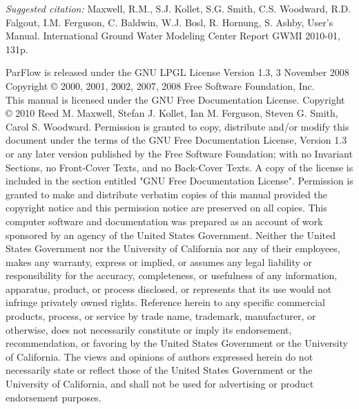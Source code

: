 
\begin{CopyrightPage}
{\em Suggested citation: }Maxwell, R.M., S.J. Kollet, S.G. Smith, C.S. Woodward, R.D. Falgout, I.M. Ferguson, C. Baldwin, W.J. Bosl, R. Hornung, S. Ashby, \parflow{} User's Manual. International Ground Water Modeling Center Report GWMI 2010-01, 131p.\newline

{ \scriptsize
\noindent ParFlow is released under the GNU LPGL License \newline
\noindent Version 1.3, 3 November 2008 \newline
\noindent Copyright \copyright{} 2000, 2001, 2002, 2007, 2008  Free Software Foundation, Inc.\newline
{}\\
This manual is licensed under the GNU Free Documentation License.\newline\vspace{1em}
Copyright \copyright{} 2010  Reed M. Maxwell, Stefan J. Kollet, Ian M. Ferguson, Steven G. Smith, Carol S. Woodward. 
Permission is granted to copy, distribute and/or modify this document
under the terms of the GNU Free Documentation License, Version 1.3
or any later version published by the Free Software Foundation; with no Invariant Sections, no Front-Cover Texts, and no Back-Cover Texts. A copy of the license is included in the section entitled "GNU Free Documentation License".
Permission is granted to make and distribute verbatim copies of this
manual provided the copyright notice and this permission notice are
preserved on all copies.\newline\vspace{0.1em}
This computer software and documentation was prepared as an account of
work sponsored by an agency of the United  States Government.  Neither
the United States Government nor the  University of California nor any
of their employees, makes any warranty, express or implied, or assumes
any legal liability  or responsibility for the accuracy, completeness,
or   usefulness of any   information,  apparatus, product, or  process
disclosed,   or represents that  its  use would not infringe privately
owned rights.  Reference  herein to any specific  commercial products,
process,   or service by   trade  name,  trademark,  manufacturer,  or
otherwise, does not  necessarily constitute or imply its  endorsement,
recommendation, or  favoring  by the  United  States Government or the
University of California.  The views and opinions of authors expressed
herein do not necessarily state or reflect those  of the United States
Government or the University of California, and shall  not be used for
advertising or product endorsement purposes.}
\end{CopyrightPage}

